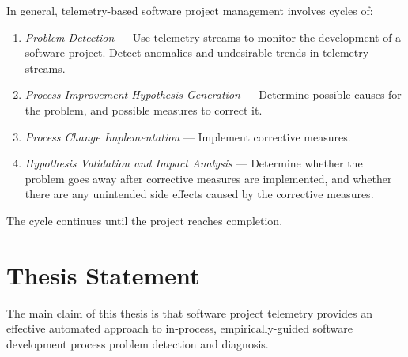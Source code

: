 In general, telemetry-based software project management involves cycles of:

\begin{enumerate}
  \item \textit{Problem Detection} --- Use telemetry streams to monitor the development of a software project. Detect anomalies and undesirable trends in telemetry streams.
    
  \item \textit{Process Improvement Hypothesis Generation} --- Determine possible causes for the problem, and possible measures to correct it.
  
  \item \textit{Process Change Implementation} --- Implement corrective measures.
  
  \item \textit{Hypothesis Validation and Impact Analysis} --- Determine whether the problem goes away after corrective measures are implemented, and whether there are any unintended side effects caused by the corrective measures.

\end{enumerate}

The cycle continues until the project reaches completion.

















\section{Thesis Statement}  \label{Intro:Thesis}

The main claim of this thesis is that software project telemetry provides an effective automated approach to in-process, empirically-guided software development process problem detection and diagnosis. 

